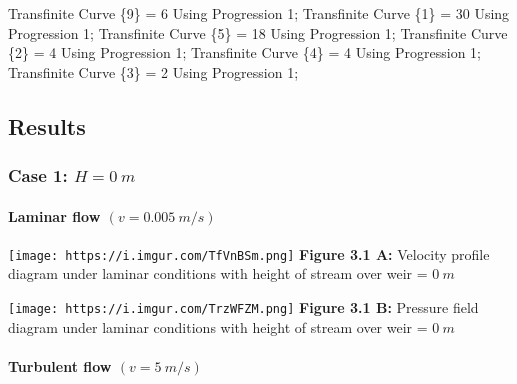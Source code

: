 \documentclass[11pt]{article}
\newenvironment{Shaded}{}{}
\newcommand{\DecValTok}[1]{\textcolor[rgb]{0.25,0.63,0.44}{{#1}}}
\newcommand{\NormalTok}[1]{{#1}}
\newcommand{\OperatorTok}[1]{\textcolor[rgb]{0.40,0.40,0.40}{{#1}}}
\begin{document}
\begin{Shaded}
\begin{Highlighting}[]
\NormalTok{Transfinite Curve }\OperatorTok{\{}\DecValTok{9}\OperatorTok{\}} \OperatorTok{=} \DecValTok{6}\NormalTok{ Using Progression }\DecValTok{1}\OperatorTok{;}
\NormalTok{Transfinite Curve }\OperatorTok{\{}\DecValTok{1}\OperatorTok{\}} \OperatorTok{=} \DecValTok{30}\NormalTok{ Using Progression }\DecValTok{1}\OperatorTok{;}
\NormalTok{Transfinite Curve }\OperatorTok{\{}\DecValTok{5}\OperatorTok{\}} \OperatorTok{=} \DecValTok{18}\NormalTok{ Using Progression }\DecValTok{1}\OperatorTok{;}
\NormalTok{Transfinite Curve }\OperatorTok{\{}\DecValTok{2}\OperatorTok{\}} \OperatorTok{=} \DecValTok{4}\NormalTok{ Using Progression }\DecValTok{1}\OperatorTok{;}
\NormalTok{Transfinite Curve }\OperatorTok{\{}\DecValTok{4}\OperatorTok{\}} \OperatorTok{=} \DecValTok{4}\NormalTok{ Using Progression }\DecValTok{1}\OperatorTok{;}
\NormalTok{Transfinite Curve }\OperatorTok{\{}\DecValTok{3}\OperatorTok{\}} \OperatorTok{=} \DecValTok{2}\NormalTok{ Using Progression }\DecValTok{1}\OperatorTok{;}
\end{Highlighting}
\end{Shaded}

\hypertarget{results}{%
\subsection{Results}\label{results}}

\hypertarget{case-1-h-0-m-1}{%
\subsubsection{\texorpdfstring{Case 1:
\(H = 0\ m\)}{Case 1: H = 0\textbackslash{} m}}\label{case-1-h-0-m-1}}

\hypertarget{laminar-flow-v-0.005-ms}{%
\paragraph{\texorpdfstring{Laminar flow
\((v = 0.005\ m/s)\)}{Laminar flow (v = 0.005\textbackslash{} m/s)}}\label{laminar-flow-v-0.005-ms}}

\texttt{[image: https://i.imgur.com/TfVnBSm.png]} \textbf{Figure 3.1 A:}
Velocity profile diagram under laminar conditions with height of stream
over weir = \(0\ m\)

\texttt{[image: https://i.imgur.com/TrzWFZM.png]} \textbf{Figure 3.1 B:}
Pressure field diagram under laminar conditions with height of stream
over weir = \(0\ m\)

\hypertarget{turbulent-flow-v-5-ms}{%
\paragraph{\texorpdfstring{Turbulent flow
\((v = 5\ m/s)\)}{Turbulent flow (v = 5\textbackslash{} m/s)}}\label{turbulent-flow-v-5-ms}}
\end{document}
